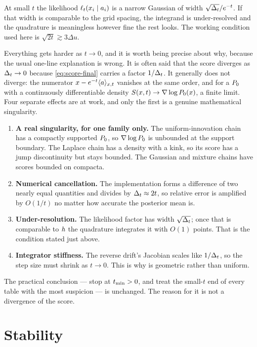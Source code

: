 At small $t$ the likelihood $\ell_t(x_i\mid a_i)$ is a narrow Gaussian of width
$\sqrt{\Delta_t}/e^{-t}$. If that width is comparable to the grid spacing, the integrand is
under-resolved and the quadrature is meaningless however fine the rest looks. The working
condition used here is $\sqrt{2t} \gtrsim 3\Delta u$.

Everything gets harder as $t\to0$, and it is worth being precise about why, because the usual
one-line explanation is wrong. It is often said that the score diverges as $\Delta_t\to0$ because
\eqref{eq:score-final} carries a factor $1/\Delta_t$. It generally does not diverge: the numerator
$x - e^{-t}\langle a \rangle_{x,t}$ vanishes at the same order, and for a $P_0$ with a continuously
differentiable density $S(x,t)\to\nabla\log P_0(x)$, a finite limit. Four separate effects
are at work, and only the first is a genuine mathematical singularity.

\begin{enumerate}
\item \textbf{A real singularity, for one family only.} The uniform-innovation chain has a
      compactly supported $P_0$, so $\nabla\log P_0$ is unbounded at the support boundary. The
      Laplace chain has a density with a kink, so its score has a jump discontinuity but stays
      bounded. The Gaussian and mixture chains have scores bounded on compacta.
\item \textbf{Numerical cancellation.} The implementation forms a difference of two nearly
      equal quantities and divides by $\Delta_t\approx2t$, so relative error is amplified by
      $O(1/t)$ no matter how accurate the posterior mean is.
\item \textbf{Under-resolution.} The likelihood factor has width $\sqrt{\Delta_t}$; once that is
      comparable to $h$ the quadrature integrates it with $O(1)$ points. That is the
      condition stated just above.
\item \textbf{Integrator stiffness.} The reverse drift's Jacobian scales like $1/\Delta_t$, so the
      step size must shrink as $t\to0$. This is why  is
      geometric rather than uniform.
\end{enumerate}

\noindent
The practical conclusion --- stop at $t_{\min}>0$, and treat the small-$t$ end of every table with
the most suspicion --- is unchanged. The reason for it is not a divergence of the score.

\section{Stability}

